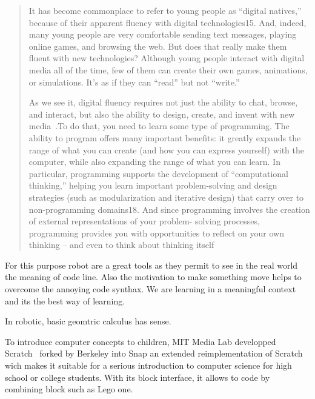 \begin{quotation}

    It has become commonplace to refer to young people as “digital natives,” because of their apparent fluency with digital technologies15. And, indeed, many young people are very comfortable sending text messages, playing online games, and browsing the web. But does that really make them fluent with new technologies? Although young people interact with digital media all of the time, few of them can create their own games, animations, or simulations. It’s as if they can “read” but not “write.”

    As we see it, digital fluency requires not just the ability to chat, browse, and interact, but also the ability to design, create, and invent with new media~\cite{resnick2008sowing}.To do that, you need to learn some type of programming. The ability to program offers many important benefits: it greatly expands the range of what you can create (and how you can express yourself) with the computer, while also expanding the range of what you can learn. In particular, programming supports the development of “computational thinking,” helping you learn important problem-solving and design strategies (such as modularization and iterative design) that carry over to non-programming domains18. And since programming involves the creation of external representations of your problem- solving processes, programming provides you with opportunities to reflect on your own thinking – and even to think about thinking itself~\cite{disessa2001changing}


\end{quotation}


For this purpose robot are a great tools as they permit to see in the real world the meaning of code line. Also the motivation to make something move helps to overcome the annoying code synthax.
We are learning in a meaningful context and its the best way of learning.

In robotic, basic geomtric calculus has sense.

To introduce computer concepts to children, MIT Media Lab developped Scratch~\cite{resnick2009scratch} forked by Berkeley into Snap an extended reimplementation of Scratch wich makes it suitable for a serious introduction to computer science for high school or college students. With its block interface, it allows to code by combining block such as Lego one.


